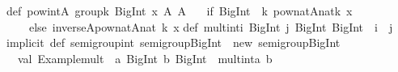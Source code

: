 \begin{isabellebody}
\begin{isamarkuptext}
{}\isanewline
\isanewline
def\ pow{}int{}A{}\ group{}{}k{}\ BigInt{}\ x{}\ A{}{}\ A\ {}\isanewline
\ \ {}if\ {}BigInt{}{}{}\ {}{}\ k{}\ pow{}nat{}A{}{}nat{}k{}{}\ x{}\isanewline
\ \ \ \ else\ inverse{}A{}{}pow{}nat{}A{}{}nat{}{}{}\ k{}{}{}\ x{}{}{}\isanewline
\isanewline
def\ mult{}int{}i{}\ BigInt{}\ j{}\ BigInt{}{}\ BigInt\ {}\ i\ {}\ j\isanewline
\isanewline
implicit\ def\ semigroup{}int{}\ semigroup{}BigInt{}\ {}\ new\ semigroup{}BigInt{}\ {}\isanewline
\ \ val\ {}Example{}mult{}\ {}\ {}a{}\ BigInt{}\ b{}\ BigInt{}\ {}{}\ mult{}int{}a{}\ b{}\isanewline

\end{isamarkuptext}
\end{isabellebody}
